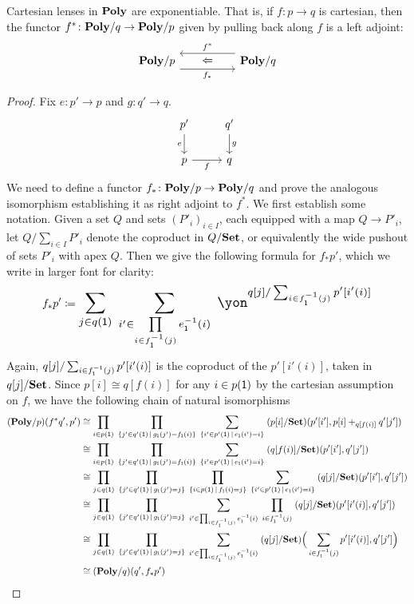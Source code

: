 \documentclass[Book-Poly]{subfiles}
\begin{document}
\begin{theorem}\label{thm.cart_exponentiable}
Cartesian lenses in $\mathbf{Poly}$ are exponentiable.
That is, if $f\colon p\to q$ is cartesian, then the functor $f^*\colon\mathbf{Poly}/q\to\mathbf{Poly}/p$ given by pulling back along $f$ is a left adjoint:
\[
\begin{tikzcd}[column sep=50pt, background color=theoremcolor]
	\poly/p\ar[r, shift right=7pt, "f_*"']&
	\poly/q\ar[l, shift right=7pt, "f^*"']\ar[l, phantom, "\Leftarrow"]
\end{tikzcd}
\]
\end{theorem}
\begin{proof}
Fix $e\colon p'\to p$ and $g\colon q'\to q$.
\[
\begin{tikzcd}
	p'\ar[d, "e"']&q'\ar[d, "g"]\\
	p\ar[r, "f"']&q
\end{tikzcd}
\]
We need to define a functor $f_*\colon\mathbf{Poly}/p\to\mathbf{Poly}/q$ and prove the analogous isomorphism establishing it as right adjoint to $f^*$. We first establish some notation. Given a set $Q$ and sets $(P'_i)_{i\in I}$, each equipped with a map $Q\to P'_i$, let $Q/\sum_{i\in I}P'_i$ denote the coproduct in $Q/\mathbf{Set}$, or equivalently the wide pushout of sets $P'_i$ with apex $Q$. Then we give the following formula for $f_*p'$, which we write in larger font for clarity:
\begin{equation}\label{eqn.cart_exp}
f_*p'\coloneqq
\scalebox{1.3}{$\displaystyle
\sum_{j\in q(\1)}\;\sum_{i'\in\prod\limits_{i\in f_\1\inv(j)}e_\1\inv(i)}\;\yon^{q[j]/\sum_{i\in f_\1\inv(j)}p'[i'(i)]}
$}
\end{equation}
Again, $q[j]/\sum_{i\in f_{\textsf{1}}^{-1}(j)}p'[i'(i)]$ is the coproduct of the $p'[i'(i)]$, taken in $q[j]/\mathbf{Set}$. Since $p[i]\cong q[f(i)]$ for any $i\in p(\textsf{1})$ by the cartesian assumption on $f$, we have the following chain of natural isomorphisms
\begin{align*}
	(\mathbf{Poly}/p)(f^*q', p')&\cong
	\prod_{i\in p(\textsf{1})}\;\prod_{\{j'\in q'(\textsf{1})\,\mid\,g_{\textsf{1}}(j')=f_{\textsf{1}}(i)\}}\;\sum_{\{i'\in p'(\textsf{1})\,\mid\,e_{\textsf{1}}(i')=i\}}\;(p[i]/\mathbf{Set})(p'[i'],p[i]+_{q[f(i)]}q'[j'])\\&\cong
	\prod_{i\in p(\textsf{1})}\;\prod_{\{j'\in q'(\textsf{1})\,\mid\,g_{\textsf{1}}(j')=f_{\textsf{1}}(i)\}}\;\sum_{\{i'\in p'(\textsf{1})\,\mid\,e_{\textsf{1}}(i')=i\}}\;(q[f(i)]/\mathbf{Set})(p'[i'],q'[j'])\\&\cong
	\prod_{j\in q(\textsf{1})}\;\prod_{\{j'\in q'(\textsf{1})\,\mid\, g_{\textsf{1}}(j')=j\}}\;\prod_{\{i\in p(\textsf{1})\,\mid\,f_{\textsf{1}}(i)=j\}}\;\sum_{\{i'\in p'(\textsf{1})\,\mid\,e_{\textsf{1}}(i')=i\}}\;(q[j]/\mathbf{Set})(p'[i'],q'[j'])\\&\cong
	\prod_{j\in q(\textsf{1})}\;\prod_{\{j'\in q'(\textsf{1})\,\mid\, g_{\textsf{1}}(j')=j\}}\;\sum_{i'\in\prod_{i\in f_{\textsf{1}}^{-1}(j)}e_{\textsf{1}}^{-1}(i)}\;\prod_{i\in f_{\textsf{1}}^{-1}(j)}\;(q[j]/\mathbf{Set})(p'[i'(i)],q'[j'])\\&\cong
	\prod_{j\in q(\textsf{1})}\;\prod_{\{j'\in q'(\textsf{1})\,\mid\, g_{\textsf{1}}(j')=j\}}\;\sum_{i'\in\prod_{i\in f_{\textsf{1}}^{-1}(j)}e_{\textsf{1}}^{-1}(i)}\;(q[j]/\mathbf{Set})\Big(\sum_{i\in f_{\textsf{1}}^{-1}(j)}p'[i'(i)],q'[j']\Big)\\&\cong
	(\mathbf{Poly}/q)(q',f_*p')
\end{align*}
\end{proof}
\end{document}
